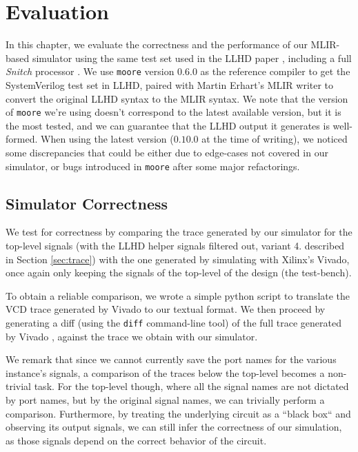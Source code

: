 \chapter{Evaluation}
\label{ch:eval}

In this chapter, we evaluate the correctness and the performance of our MLIR-based simulator using the same test set used in the LLHD paper \cite{Schuiki2020}, including a full \textit{Snitch} processor \cite{Zaruba2020}. We use \texttt{moore} version $0.6.0$ as the reference compiler to get the SystemVerilog test set in LLHD, paired with Martin Erhart's MLIR writer to convert the original LLHD syntax to the MLIR syntax. We note that the version of \texttt{moore} we're using doesn't correspond to the latest available version, but it is the most tested, and we can guarantee that the LLHD output it generates is well-formed. When using the latest version ($0.10.0$ at the time of writing), we noticed some discrepancies that could be either due to edge-cases not covered in our simulator, or bugs introduced in \texttt{moore} after some major refactorings.


\section{Simulator Correctness}
\label{sec:correctness}
We test for correctness by comparing the trace generated by our simulator for the top-level signals (with the LLHD helper signals filtered out, variant 4. described in Section \ref{sec:trace}) with the one generated by simulating with Xilinx's Vivado, once again only keeping the signals of the top-level of the design (\ie the test-bench).

To obtain a reliable comparison, we wrote a simple python script to translate the VCD trace generated by Vivado to our textual format. We then proceed by generating a diff (using the \texttt{diff} command-line tool) of the full trace generated by Vivado \cite{vivado}, against the trace we obtain with our simulator.

We remark that since we cannot currently save the port names for the various instance's signals, a comparison of the traces below the top-level becomes a non-trivial task. For the top-level though, where all the signal names are not dictated by port names, but by the original signal names, we can trivially perform a comparison. Furthermore, by treating the underlying circuit as a “black box“ and observing its output signals, we can still infer the correctness of our simulation, as those signals depend on the correct behavior of the circuit.

